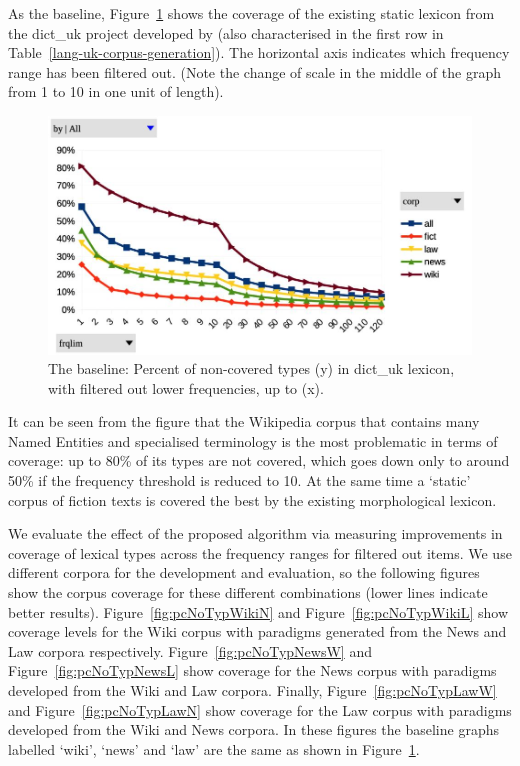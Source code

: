 \documentclass[11pt,a4paper]{article}
\begin{document}
As the baseline, Figure~\ref{fig:pcNoTypDictUK} shows the coverage of the existing static lexicon from the dict\_uk project developed by \cite{Rysin-Starko-2019} (also characterised in the first row in Table~\ref{lang-uk-corpus-generation}). The horizontal axis indicates which frequency range has been filtered out. (Note the change of scale in the middle of the graph from 1 to 10 in one unit of length).

\begin{figure}
	\includegraphics[width=\linewidth]{evaluation-coverage-dict_uk.jpg}
	\caption{The baseline: Percent of non-covered types (y) in dict\_uk lexicon, with filtered out lower frequencies, up to (x).}
	\label{fig:pcNoTypDictUK}
\end{figure}

It can be seen from the figure that the Wikipedia corpus that contains many Named Entities and specialised terminology is the most problematic in terms of coverage: up to 80\% of its types are not covered, which goes down only to around 50\% if the frequency threshold is reduced to 10. At the same time a `static' corpus of fiction texts is covered the best by the existing morphological lexicon.

We evaluate the effect of the proposed algorithm via measuring improvements in coverage of lexical types across the frequency ranges for filtered out items. We use different corpora for the development and evaluation, so the following figures show the corpus coverage for these different combinations (lower lines indicate better results). Figure~\ref{fig:pcNoTypWikiN} and Figure~\ref{fig:pcNoTypWikiL} show coverage levels for the Wiki corpus with paradigms generated from the News and Law corpora respectively. Figure~\ref{fig:pcNoTypNewsW} and Figure~\ref{fig:pcNoTypNewsL} show coverage for the News corpus with paradigms developed from the Wiki and Law corpora. Finally, Figure~\ref{fig:pcNoTypLawW} and Figure~\ref{fig:pcNoTypLawN} show coverage for the Law corpus with paradigms developed from the Wiki and News corpora. In these figures the baseline graphs labelled `wiki', `news' and `law' are the same as shown in Figure~\ref{fig:pcNoTypDictUK}.
\end{document}
